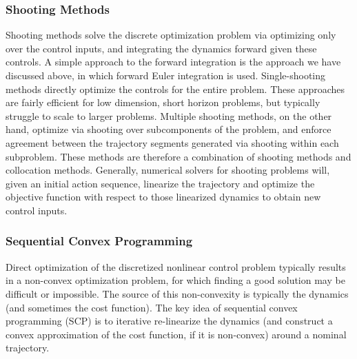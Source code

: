 \subsubsection{Shooting Methods}

Shooting methods solve the discrete optimization problem via optimizing only over the control inputs, and integrating the dynamics forward given these controls. A simple approach to the forward integration is the approach we have discussed above, in which forward Euler integration is used. Single-shooting methods directly optimize the controls for the entire problem. These approaches are fairly efficient for low dimension, short horizon problems, but typically struggle to scale to larger problems. Multiple shooting methods, on the other hand, optimize via shooting over subcomponents of the problem, and enforce agreement between the trajectory segments generated via shooting within each subproblem. These methods are therefore a combination of shooting methods and collocation methods. Generally, numerical solvers for shooting problems will, given an initial action sequence, linearize the trajectory and optimize the objective function with respect to those linearized dynamics to obtain new control inputs.



\subsubsection{Sequential Convex Programming}

Direct optimization of the discretized nonlinear control problem typically results in a non-convex optimization problem, for which finding a good solution may be difficult or impossible. The source of this non-convexity is typically the dynamics (and sometimes the cost function). The key idea of sequential convex programming (SCP) is to iterative re-linearize the dynamics (and construct a convex approximation of the cost function, if it is non-convex) around a nominal trajectory. 

